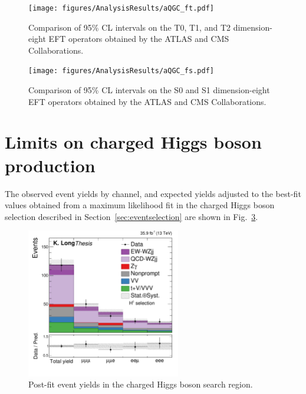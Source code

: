 \begin{figure}[htbp]
  \centering
   \texttt{[image: figures/AnalysisResults/aQGC\_ft.pdf]}
  \caption[Comparison of experimental constraints on the T0, T1, and T2 EFT operators]
  {
    Comparison of 95\% CL intervals on the T0, T1, and T2 dimension-eight EFT operators 
    obtained by the ATLAS and CMS Collaborations. 
 }
 \label{fig:aQGCCompareFT}
\end{figure}

\begin{figure}[htbp]
  \centering
   \texttt{[image: figures/AnalysisResults/aQGC\_fs.pdf]}
  \caption[Comparison of experimental constraints on the S0 and S1 dimension-eight EFT operators]
  {
    Comparison of 95\% CL intervals on the S0 and S1 dimension-eight EFT operators 
    obtained by the ATLAS and CMS Collaborations. 
 }
 \label{fig:aQGCCompareFS}
\end{figure}

\section{Limits on charged Higgs boson production}

The observed event yields by channel, and expected yields adjusted to the
best-fit values obtained from a maximum likelihood fit in the charged Higgs
boson selection described in Section~\ref{sec:eventselection} 
are shown in Fig.~\ref{fig:higgsSignalYields}.

\begin{figure}[htbp]
  \centering
   \includegraphics[width=0.6\textwidth]{figures/AnalysisResults/yieldByChannel_Higgs.pdf}
  \caption{
    Post-fit event yields in the charged Higgs boson search region.
          }
 \label{fig:higgsSignalYields}
\end{figure}

